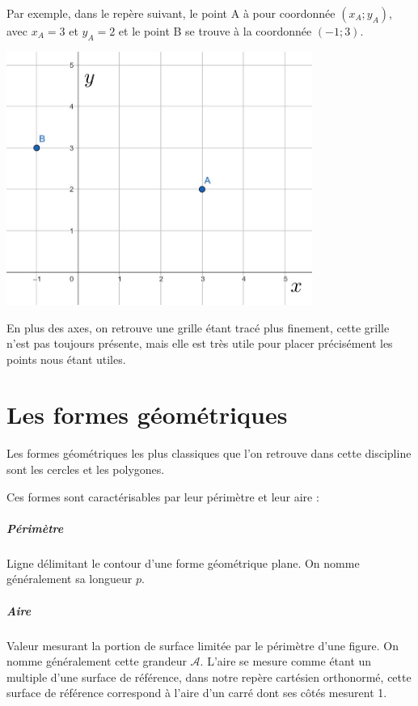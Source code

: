 \documentclass[a4paper, twoside]{article}
\begin{document}
\medbreak

Par exemple, dans le repère suivant, le point A à pour coordonnée $(x_A ; y_A)$,
avec $x_A = 3$ et $y_A = 2$ et le point B se trouve à la coordonnée $(-1 ; 3)$.

\begin{center}
	\includegraphics[width=10cm]{Image/repere_cartesien_orthonorme.jpg}
\end{center}

En plus des axes, on retrouve une grille étant tracé plus finement,
cette grille n'est pas toujours présente,
mais elle est très utile pour placer précisément les points nous étant utiles.

\newpage


\section{Les formes géométriques}

Les formes géométriques les plus classiques que l'on retrouve dans cette discipline
sont les cercles et les polygones.

\medbreak

Ces formes sont caractérisables par leur périmètre et leur aire :

\vspace{-0.2cm}

\subparagraph*{Périmètre} Ligne délimitant le contour d'une forme géométrique plane.
On nomme généralement sa longueur $p$.

\vspace{-0.2cm}

\subparagraph*{Aire} Valeur mesurant la portion de surface limitée par le périmètre d'une figure.
On nomme généralement cette grandeur $\mathcal{A}$. L'aire se mesure comme étant un multiple d'une surface
de référence, dans notre repère cartésien orthonormé, cette surface de référence correspond à l'aire
d'un carré dont ses côtés mesurent 1.
\end{document}
